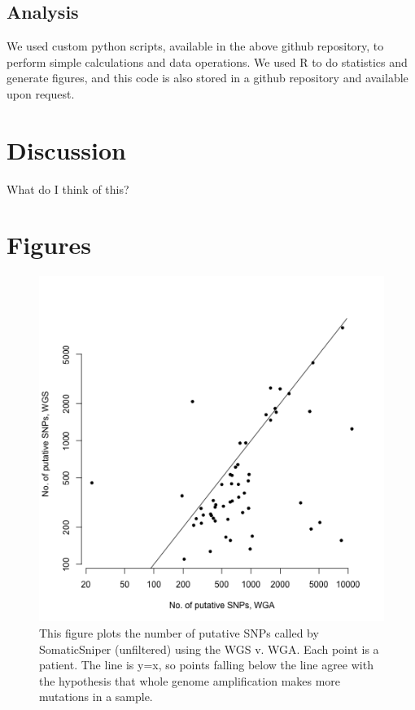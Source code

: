 \documentclass[11pt]{article} %
\begin{document}
\subsection{Analysis}

We used custom python scripts, available in the above github repository, to perform simple calculations and data operations. We used R \cite{Rsoftware} to do statistics and generate figures, and this code is also stored in a github repository and available upon request.  

\section{Discussion}

What do I think of this?

\section{Figures}

\begin{figure}
\includegraphics[scale=1.0]{C282_v_C484.png}
\caption{This figure plots the number of putative SNPs called by SomaticSniper (unfiltered) using the WGS v. WGA. Each point is a patient. The line is y=x, so points falling below the line agree with the hypothesis that whole genome amplification makes more mutations in a sample.}
\end{figure}
\end{document}
